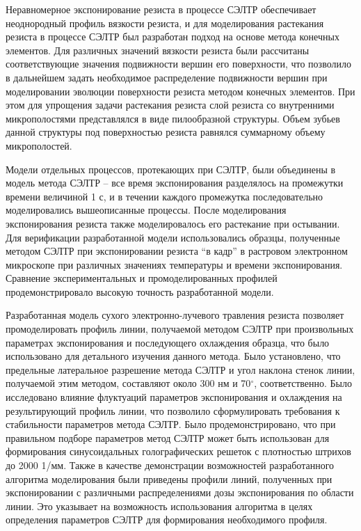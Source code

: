 Неравномерное экспонирование резиста в процессе СЭЛТР обеспечивает неоднородный профиль вязкости резиста, и для моделирования растекания резиста в процессе СЭЛТР был разработан подход на основе метода конечных элементов. Для различных значений вязкости резиста были рассчитаны соответствующие значения подвижности вершин его поверхности, что позволило в дальнейшем задать необходимое распределение подвижности вершин при моделировании эволюции поверхности резиста методом конечных элементов. При этом для упрощения задачи растекания резиста слой резиста со внутренними микрополостями представлялся в виде пилообразной структуры. Объем зубьев данной структуры под поверхностью резиста равнялся суммарному объему микрополостей.

Модели отдельных процессов, протекающих при СЭЛТР, были объединены в модель метода СЭЛТР -- все время экспонирования разделялось на промежутки времени величиной 1 с, и в течении каждого промежутка последовательно моделировались вышеописанные процессы. После моделирования экспонирования резиста также моделировалось его растекание при остывании. Для верификации разработанной модели использовались образцы, полученные методом СЭЛТР при экспонировании резиста ``в кадр'' в растровом электронном микроскопе при различных значениях температуры и времени экспонирования. Сравнение экспериментальных и промоделированных профилей продемонстрировало высокую точность разработанной модели.

Разработанная модель сухого электронно-лучевого травления резиста позволяет промоделировать профиль линии, получаемой методом СЭЛТР при произвольных параметрах экспонирования и последующего охлаждения образца, что было использовано для детального изучения данного метода. Было установлено, что предельные латеральное разрешение метода СЭЛТР и угол наклона стенок линии, получаемой этим методом, составляют около 300 нм и 70$^\circ$, соответственно. Было исследовано влияние флуктуаций параметров экспонирования и охлаждения на результирующий профиль линии, что позволило сформулировать требования к стабильности параметров метода СЭЛТР.  Было продемонстрировано, что при правильном подборе параметров метод СЭЛТР может быть использован для формирования синусоидальных голографических решеток с плотностью штрихов до 2000 1/мм. Также в качестве демонстрации возможностей разработанного алгоритма моделирования были приведены профили линий, полученных при экспонировании с различными распределениями дозы экспонирования по области линии. Это указывает на возможность использования алгоритма в целях определения параметров СЭЛТР для формирования необходимого профиля.
